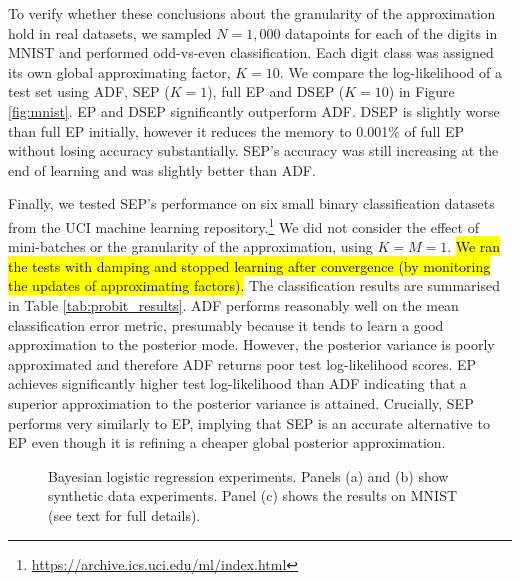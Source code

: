 To verify whether these conclusions about the granularity of the approximation hold in real datasets, we sampled $N=1,000$ datapoints for each of the digits in MNIST and performed odd-vs-even classification. Each digit class was assigned its own global approximating factor, $K=10$. We compare the log-likelihood of a test set using ADF, SEP ($K=1$), full EP and DSEP ($K=10$) in Figure \ref{fig:mnist}. EP and DSEP significantly outperform ADF. DSEP is slightly worse than full EP initially, however it reduces the memory to 0.001\% of full EP without losing accuracy substantially. SEP's accuracy was still increasing at the end of learning and was slightly better than ADF.

Finally, we tested SEP's performance on six small binary classification datasets from the UCI machine learning repository.\footnote{\url{https://archive.ics.uci.edu/ml/index.html}} We did not consider the effect of mini-batches or the granularity of the approximation, using $K=M=1$. \hl{We ran the tests with damping and stopped learning after convergence (by monitoring the updates of approximating factors).} The classification results are summarised in Table \ref{tab:probit_results}. ADF performs reasonably well on the mean classification error metric, presumably because it tends to learn a good approximation to the posterior mode. However, the posterior variance is poorly approximated and therefore ADF returns poor test log-likelihood scores. EP achieves significantly higher test log-likelihood than ADF indicating that a superior approximation to the posterior variance is attained. Crucially, SEP performs very similarly to EP, implying that SEP is an accurate alternative to EP even though it is refining a cheaper global posterior approximation.

\begin{figure}
\centering
\def\svgwidth{0.31\linewidth}
\subfigure[\label{fig:sep_probit}]{
}
%
%
\def\svgwidth{0.31\linewidth}
\subfigure[\label{fig:daep_probit}]{
}
%
%
\def\svgwidth{0.31\linewidth}
\subfigure[\label{fig:mnist}]{
}
\caption{Bayesian logistic regression experiments. Panels (a) and (b) show synthetic data experiments. Panel (c) shows the results on MNIST (see text for full details).}
\end{figure}

